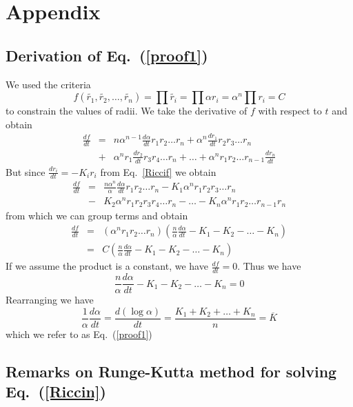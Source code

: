 \documentclass[12pt]{article}
\begin{document}
\newpage
  


\newpage
\section{Appendix}

\subsection{Derivation of Eq.~(\ref{proof1})}
\maketitle
	
	We used the criteria $$f(\tilde{r_1},\tilde{r_2},\ldots,\tilde{r_n}) = \prod{\tilde{r_i}} = \prod{\alpha r_i} = \alpha^n\prod{r_i}= C$$ to constrain the values of radii. We take the derivative of $f$ with respect to $t$ and obtain
	\begin{eqnarray*}
	\frac{df}{dt} & = & n\alpha^{n-1}\frac{d\alpha}{dt}r_1r_2\ldots r_n + \alpha^n\frac{dr_1}{dt}r_2r_3\ldots r_n\\
								& + & \alpha^nr_1\frac{dr_2}{dt}r_3r_4\ldots r_n + \ldots + \alpha^nr_1r_2\ldots r_{n-1}\frac{dr_n}{dt}
	\end{eqnarray*}
	But since $\displaystyle \frac{dr_i}{dt} = -K_ir_i$ from Eq.~\ref{Riccif} we obtain
	\begin{eqnarray*}
	\frac{df}{dt} & = & \frac{n\alpha^{n}}{\alpha}\frac{d\alpha}{dt}r_1r_2\ldots r_n - K_1\alpha^nr_1r_2r_3\ldots r_n\\
								& - & K_2\alpha^nr_1r_2r_3r_4\ldots r_n - \ldots - K_n\alpha^nr_1r_2\ldots r_{n-1}r_n
	\end{eqnarray*}
	from which we can group terms and obtain
	\begin{eqnarray*}
	\frac{df}{dt} & = & (\alpha^nr_1r_2\ldots r_n)(\frac{n}{\alpha}\frac{d\alpha}{dt} - K_1 - K_2 - \ldots - K_n)\\
								& = & C(\frac{n}{\alpha}\frac{d\alpha}{dt} - K_1 - K_2 - \ldots - K_n)
	\end{eqnarray*}
	If we assume the product is a constant, we have $\displaystyle \frac{df}{dt} = 0.$ Thus we have $$\frac{n}{\alpha}\frac{d\alpha}{dt} - K_1 - K_2 - \ldots - K_n = 0$$
	Rearranging we have
$$\frac{1}{\alpha}\frac{d\alpha}{dt} = \frac{d(\log \alpha)}{dt} = \frac{K_1 + K_2 + \ldots + K_n}{n} = \overline{K}$$
	which we refer to as Eq.~(\ref{proof1})
  
  \subsection{Remarks on Runge-Kutta method for solving Eq.~(\ref{Riccin})}
	\maketitle
\end{document}
